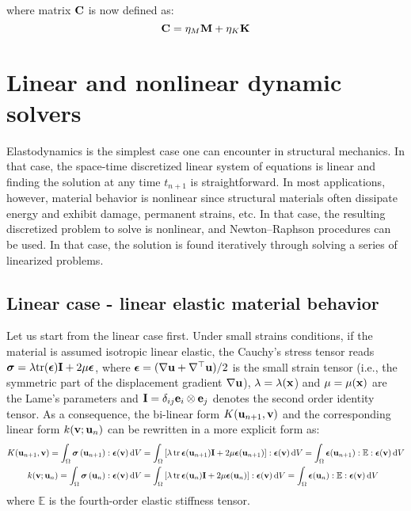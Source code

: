 where matrix ${\bf C}$ is now defined as:
\begin{equation}
{\bf C}=\eta_{M}{\bf M}+\eta_{K}{\bf K}
\end{equation}


\section{Linear and nonlinear dynamic solvers}

Elastodynamics is the simplest case one can encounter in structural mechanics. In that case, the space-time discretized linear system of equations is linear and finding the solution at any time $t_{n+1}$ is straightforward. In most applications, however, material behavior is nonlinear since structural materials often dissipate energy and exhibit
damage, permanent strains, etc. In that case, the resulting discretized problem to solve is nonlinear, and Newton--Raphson procedures can be used. In that case, the solution is found iteratively through solving a series of linearized problems.

\subsection{Linear case - linear elastic material behavior}

Let us start from the linear case first. Under small strains conditions, if the material is assumed isotropic linear elastic, the Cauchy's stress tensor reads $\mbox{\boldmath${\sigma}$}=\lambda\text{tr}(\mbox{\boldmath${\epsilon}$}){{\bf{I}}}+2\mu\mbox{\boldmath${\epsilon}$}$,
where $\mbox{\boldmath${\epsilon}$}=(\nabla{\bf{u}}+\nabla^{\top}{\bf{u}})/2$ is the small strain tensor (i.e., the symmetric part of the displacement gradient $\nabla{\bf{u}}$), $\lambda=\lambda({\bf{x}}$) and $\mu=\mu({\bf{x}})$ are the Lame's parameters and ${{\bf{I}}}=\delta_{ij}{\bf{e}}_{i}\otimes{\bf{e}}_{j}$ denotes the second order identity tensor. As a consequence, the bi-linear form $K({{\bf{u}}_{n+1}},{\bf{v}})$ and the corresponding linear form $k({\bf{v}};{{\bf{u}}_{n}})$ can be rewritten in a more explicit form as:
\begin{equation}
\begin{aligned}K({{\bf{u}}_{n+1}},{\bf{v}})=\int_{\Omega}\mbox{\boldmath${\sigma}$}\left({{\bf{u}}_{n+1}}\right):\mbox{\boldmath${\epsilon}$}({\bf{v}})\,{\rm d}V & =\int_{\Omega}\left[\lambda\mathop{\rm tr}\mbox{\boldmath${\epsilon}$}({\bf{u}}_{n+1}){{\bf{I}}}+2\mu\mbox{\boldmath${\epsilon}$}({\bf{u}}_{n+1})\right]:\mbox{\boldmath${\epsilon}$}({\bf{v}})\,{\rm d}V=\int_{\Omega}\mbox{\boldmath${\epsilon}$}({\bf{u}}_{n+1}):\mathbb{E}:\mbox{\boldmath${\epsilon}$}({\bf{v}})\,{\rm d}V\\
k({\bf{v}};{{\bf{u}}_{n}})=\int_{\Omega}\mbox{\boldmath${\sigma}$}\left({{\bf{u}}_{n}}\right):\mbox{\boldmath${\epsilon}$}({\bf{v}})\,{\rm d}V & =\int_{\Omega}\left[\lambda\mathop{\rm tr}\mbox{\boldmath${\epsilon}$}({\bf{u}}_{n}){{\bf{I}}}+2\mu\mbox{\boldmath${\epsilon}$}({\bf{u}}_{n})\right]:\mbox{\boldmath${\epsilon}$}({\bf{v}})\,{\rm d}V=\int_{\Omega}\mbox{\boldmath${\epsilon}$}({\bf{u}}_{n}):\mathbb{E}:\mbox{\boldmath${\epsilon}$}({\bf{v}})\,{\rm d}V
\end{aligned}
\end{equation}
where $\mathbb{E}$ is the fourth-order elastic stiffness tensor. 

